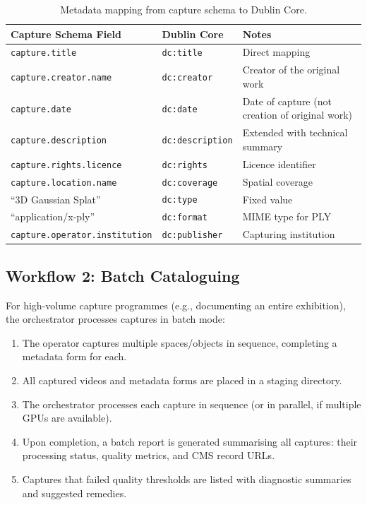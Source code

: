 \begin{table}[htbp]
  \centering
  \caption{Metadata mapping from capture schema to Dublin Core.}
  \label{tab:dublin-core-mapping}
  \begin{tabular}{@{}l l L{6cm}@{}}
    \toprule
    \textbf{Capture Schema Field} & \textbf{Dublin Core} & \textbf{Notes} \\
    \midrule
    \texttt{capture.title}       & \texttt{dc:title}       & Direct mapping \\
    \texttt{capture.creator.name} & \texttt{dc:creator}    & Creator of the original work \\
    \texttt{capture.date}        & \texttt{dc:date}        & Date of capture (not creation of original work) \\
    \texttt{capture.description} & \texttt{dc:description} & Extended with technical summary \\
    \texttt{capture.rights.licence} & \texttt{dc:rights}   & Licence identifier \\
    \texttt{capture.location.name} & \texttt{dc:coverage}  & Spatial coverage \\
    ``3D Gaussian Splat''        & \texttt{dc:type}        & Fixed value \\
    ``application/x-ply''        & \texttt{dc:format}      & MIME type for PLY \\
    \texttt{capture.operator.institution} & \texttt{dc:publisher} & Capturing institution \\
    \bottomrule
  \end{tabular}
\end{table}

\subsection{Workflow 2: Batch Cataloguing}

For high-volume capture programmes (e.g., documenting an entire exhibition), the orchestrator processes captures in batch mode:

\begin{enumerate}
  \item The operator captures multiple spaces/objects in sequence, completing a metadata form for each.
  \item All captured videos and metadata forms are placed in a staging directory.
  \item The orchestrator processes each capture in sequence (or in parallel, if multiple GPUs are available).
  \item Upon completion, a batch report is generated summarising all captures: their processing status, quality metrics, and CMS record URLs.
  \item Captures that failed quality thresholds are listed with diagnostic summaries and suggested remedies.
\end{enumerate}

